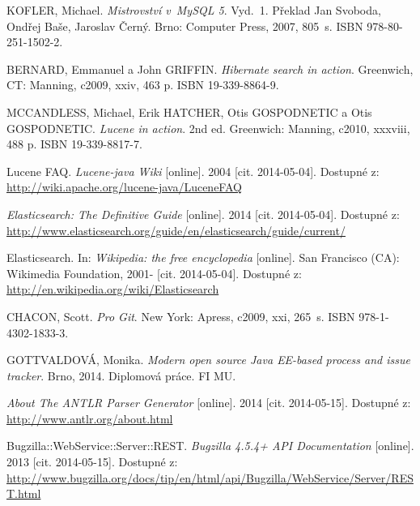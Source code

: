 \documentclass[11pt,oneside]{fithesis2}
\begin{document}
\begin{thebibliography}{1}

KOFLER, Michael. \textit{Mistrovství v~MySQL 5}. Vyd.~1. Překlad Jan Svoboda, Ondřej Baše, Jaroslav Černý. Brno: Computer Press, 2007, 805~s. ISBN 978-80-251-1502-2. 

BERNARD, Emmanuel a John GRIFFIN. \textit{Hibernate search in action}. Greenwich, CT: Manning, c2009, xxiv, 463 p. ISBN 19-339-8864-9. 

MCCANDLESS, Michael, Erik HATCHER, Otis GOSPODNETIC a Otis GOSPODNETIC. \textit{Lucene in action}. 2nd ed. Greenwich: Manning, c2010, xxxviii, 488 p. ISBN 19-339-8817-7. 

Lucene FAQ. \textit{Lucene-java Wiki} [online]. 2004 [cit. 2014-05-04]. Dostupné z: \url{http://wiki.apache.org/lucene-java/LuceneFAQ}

\textit{Elasticsearch: The Definitive Guide} [online]. 2014 [cit. 2014-05-04]. Dostupné z: \url{http://www.elasticsearch.org/guide/en/elasticsearch/guide/current/}

Elasticsearch. In: \textit{Wikipedia: the free encyclopedia} [online]. San Francisco (CA): Wikimedia Foundation, 2001- [cit. 2014-05-04]. Dostupné z: \url{http://en.wikipedia.org/wiki/Elasticsearch}

CHACON, Scott. \textit{Pro Git}. New York: Apress, c2009, xxi, 265~s. ISBN 978-1-4302-1833-3. 

GOTTVALDOVÁ, Monika. \textit{Modern open source Java EE-based process and issue tracker}. Brno, 2014. Diplomová práce. FI MU.

\textit{About The ANTLR Parser Generator} [online]. 2014 [cit. 2014-05-15]. Dostupné z: \url{http://www.antlr.org/about.html}

Bugzilla::WebService::Server::REST. \textit{Bugzilla 4.5.4+ API Documentation} [online]. 2013 [cit. 2014-05-15]. Dostupné z: \url{http://www.bugzilla.org/docs/tip/en/html/api/Bugzilla/WebService/Server/REST.html}


\end{thebibliography}

\endgroup

\appendix
\end{document}
